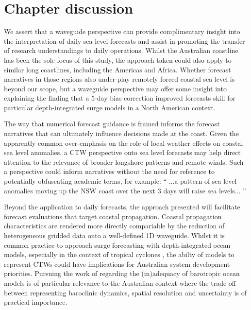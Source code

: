 \section{Chapter discussion}
We assert that a waveguide perspective can provide complimentary insight into the interpretation of daily sea level forecasts and assist in promoting the transfer of research understandings to daily operations.  
Whilst the Australian coastline has been the sole focus of this study, the approach taken could also apply to similar long coastlines, including the Americas and Africa. Whether forecast narratives in those regions also under-play remotely forced coastal sea level is beyond our scope, but a waveguide perspective may offer some insight into explaining the \citet{DiLiberto:2011dya} finding that a 5-day bias correction improved forecasts skill for particular depth-integrated surge models in a North American context.


The way that numerical forecast guidance is framed informs the forecast narratives that can ultimately influence decisions made at the coast.
Given the apparently common over-emphasis on the role of local weather effects on coastal sea level anomalies, a CTW perspective onto sea level forecasts may help direct attention to the relevance of broader longshore patterns and remote winds.
Such a perspective could inform narratives without the need for reference to potentially obfuscating academic terms, for example:
``
...a pattern of sea level anomalies moving up the NSW coast over the next 3 days will raise sea levels... 
''

Beyond the application to daily forecasts, the approach presented will facilitate forecast evaluations that target coastal propagation.
Coastal propagation characteristics are rendered more directly compariable by the reduction of heterogeneous gridded data onto a well-defined 1D waveguide. 
Whilst it is common practice to approach surge forecasting with depth-integrated ocean models, especially in the context of tropical cyclones \citep{Veeramony:2017}, the abilty of models to represent CTWs could have implications for Australian system development priorities. 
Pursuing the work of \citet{Hetzel:2018hh} regarding the (in)adequacy of barotropic ocean models is of particular relevance to the Australian context where the trade-off between representing baroclinic dynamics, spatial resolution and uncertainty is of practical importance.  
     

